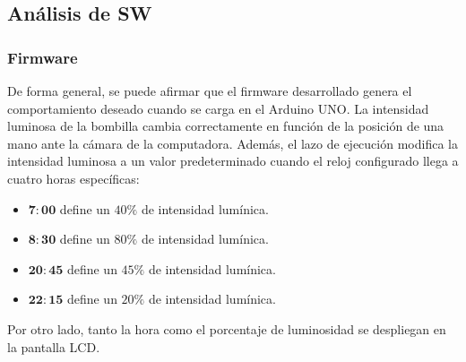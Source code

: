 \subsection{Análisis de SW}

\subsubsection{Firmware}

De forma general, se puede afirmar que el firmware desarrollado genera el comportamiento deseado cuando se carga en el Arduino UNO. La intensidad luminosa de la bombilla cambia correctamente en función de la posición de una mano ante la cámara de la computadora. Además, el lazo de ejecución modifica la intensidad luminosa a un valor predeterminado cuando el reloj configurado llega a cuatro horas específicas:

\begin{itemize}
    \item $\boldsymbol{7:00}$ define un $40\%$ de intensidad lumínica.
    \item $\boldsymbol{8:30}$ define un $80\%$ de intensidad lumínica.
    \item $\boldsymbol{20:45}$ define un $45\%$ de intensidad lumínica.
    \item $\boldsymbol{22:15}$ define un $20\%$ de intensidad lumínica.
\end{itemize}

Por otro lado, tanto la hora como el porcentaje de luminosidad se despliegan en la pantalla LCD.

